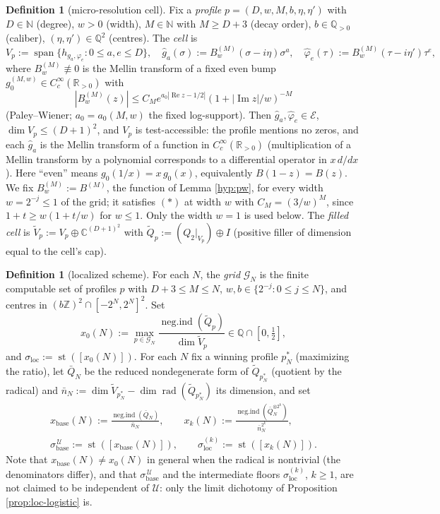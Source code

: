 \documentclass[11pt,reqno]{amsart}
\theoremstyle{definition}
\newtheorem{definition}[theorem]{Definition}
\newcommand{\negind}{\operatorname{neg.ind}}
\newcommand{\R}{\mathbb{R}}
\newcommand{\C}{\mathbb{C}}
\newcommand{\N}{\mathbb{N}}
\newcommand{\Z}{\mathbb{Z}}
\newcommand{\sst}{\operatorname{st}}
\begin{document}
\begin{definition}[micro-resolution cell]\label{def:cell}
Fix a \emph{profile} \(p=(D,w,M,b,\eta,\eta')\) with \(D\in\N\) (degree), \(w>0\)
(width), \(M\in\N\) with \(M\geq D+3\) (decay order), \(b\in\mathbb Q_{>0}\)
(caliber), \((\eta,\eta')\in\mathbb Q^2\) (centres). The \emph{cell} is
\[
V_p:=\operatorname{span}\bigl\{h_{g_a,\varphi_e}:0\leq a,e\leq D\bigr\},\quad
\hat g_a(\sigma):=B^{(M)}_w(\sigma-i\eta)\sigma^a,\quad
\hat\varphi_e(\tau):=B^{(M)}_w(\tau-i\eta')\tau^e,
\]
where \(B^{(M)}_w\not\equiv0\) is the Mellin transform of a fixed even bump
\(g_0^{(M,w)}\in C_c^\infty(\R_{>0})\) with
\[
|B^{(M)}_w(z)|\leq C_M e^{a_0|\operatorname{Re}z-1/2|}
(1+|\operatorname{Im}z|/w)^{-M}
\tag{$\ast$}
\]
(Paley--Wiener; \(a_0=a_0(M,w)\) the fixed log-support). Then
\(\hat g_a,\hat\varphi_e\in\mathcal E\), \(\dim V_p\leq(D+1)^2\), and \(V_p\) is
test-accessible: the profile mentions no zeros, and each \(\hat g_a\) is the
Mellin transform of a function in \(C_c^\infty(\R_{>0})\) (multiplication of a
Mellin transform by a polynomial corresponds to a differential operator in
\(x\,d/dx\)). Here ``even'' means \(g_0(1/x)=x\,g_0(x)\), equivalently \(B(1-z)=B(z)\). We fix \(B^{(M)}_w:=B^{(M)}\), the function of Lemma \ref{hyp:pw}, for every width \(w=2^{-j}\leq1\) of the grid; it satisfies \((\ast)\) at width \(w\) with \(C_M=(3/w)^M\), since \(1+t\geq w(1+t/w)\) for \(w\leq1\). Only the width \(w=1\) is used below. The
\emph{filled cell} is \(\tilde V_p:=V_p\oplus\C^{(D+1)^2}\)
with \(\tilde Q_p:=(Q_2|_{V_p})\oplus I\) (positive filler of dimension equal to
the cell's cap).
\end{definition}

\begin{definition}[localized scheme]\label{def:loc-scheme}
For each \(N\), the \emph{grid} \(\mathcal G_N\) is the finite computable set of
profiles \(p\) with \(D+3\leq M\leq N\), \(w,b\in\{2^{-j}:0\leq j\leq N\}\), and centres in
\((b\Z)^2\cap[-2^N,2^N]^2\). Set
\[
x_0(N):=\max_{p\in\mathcal G_N}\frac{\negind(\tilde Q_p)}{\dim\tilde V_p}
\in\mathbb Q\cap[0,\tfrac12],
\]
and \(\sigma_{\mathrm{loc}}:=\sst([x_0(N)])\). For each \(N\) fix a winning
profile \(p^*_N\) (maximizing the ratio), let \(\bar Q_N\) be the reduced
nondegenerate form of \(\tilde Q_{p^*_N}\) (quotient by the radical) and
\(\bar n_N:=\dim\tilde V_{p^*_N}-\dim\operatorname{rad}(\tilde Q_{p^*_N})\) its
dimension, and set
\[
\begin{gathered}
x_{\mathrm{base}}(N):=\frac{\negind(\bar Q_N)}{\bar n_N},\qquad
x_k(N):=\frac{\negind(\bar Q_N^{\otimes2^k})}{\bar n_N^{2^k}},\\[2pt]
\sigma_{\mathrm{base}}^{\,\mathcal U}:=\sst([x_{\mathrm{base}}(N)]),\qquad
\sigma_{\mathrm{loc}}^{(k)}:=\sst([x_k(N)]).
\end{gathered}
\]
Note that \(x_{\mathrm{base}}(N)\neq x_0(N)\) in general when the radical is
nontrivial (the denominators differ), and that
\(\sigma_{\mathrm{base}}^{\,\mathcal U}\) and the intermediate floors
\(\sigma_{\mathrm{loc}}^{(k)}\), \(k\geq1\), are not claimed to be independent
of \(\mathcal U\): only the limit dichotomy of Proposition
\ref{prop:loc-logistic} is.
\end{definition}
\end{document}
